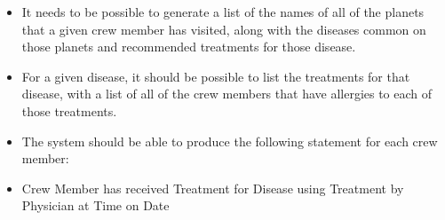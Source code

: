 \documentclass{report}
\begin{document}
\begin{mdframed}
\begin{itemize}
            \item It needs to be possible to generate a list of the names of all of the planets that a given crew member has visited, along with the diseases common on those planets and recommended treatments for those disease.
            \item For a given disease, it should be possible to list the treatments for that disease, with a list of all of the crew members that have allergies to each of those treatments.
            \item The system should be able to produce the following statement for each crew member:
            \item Crew Member has received Treatment for Disease using Treatment by Physician at Time on Date
        \end{itemize}
    \end{mdframed}
\begin{figure}[ht]
    \centering
    \label{fig:1}
\end{figure}

    
\end{document}
